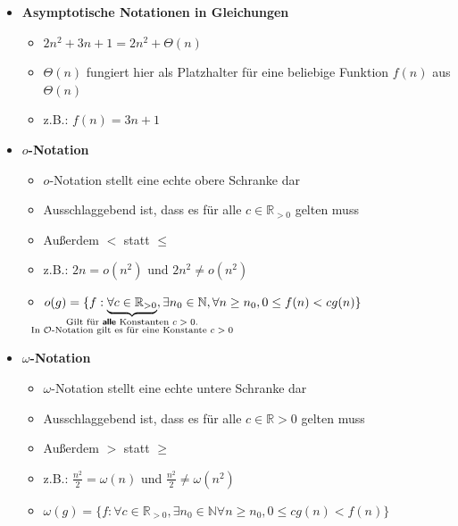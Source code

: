 \documentclass[
    12pt,
    a4paper,
    ngerman,
    color=3b,%
    marginpar=false,
    colorback=false,
    leqno,
]{tudaexercise}
\begin{document}
\begin{itemize}
    \item \textbf{Asymptotische Notationen in Gleichungen}
          \begin{itemize}
              \item $2n^2 + 3n + 1 = 2n^2 + \Theta(n)$
              \item $\Theta(n)$ fungiert hier als Platzhalter für eine beliebige Funktion $f(n)$ aus $\Theta(n)$
              \item z.B.: $f(n) = 3n + 1$
          \end{itemize}

    \item \textbf{$o$-Notation}
          \begin{itemize}
              \item $o$-Notation stellt eine echte obere Schranke dar
              \item Ausschlaggebend ist, dass es für alle $c \in \mathbb{R}_{>0}$ gelten muss
              \item Au\ss erdem $<$ statt $\leq$
              \item z.B.: $2n = o(n^2)$ und $2n^2 \neq o(n^2)$
              \item[] %
                    $o(g)=\{f:\underbrace{\forall c \in \mathbb{R}_{>0}}_{
                        \mathclap{
                            \substack{
                                \text{Gilt für \fatsf{alle} Konstanten $c>0$.}\\
                                \text{In $\mathcal{O}$-Notation gilt es für eine Konstante $c>0$}}}
                        }, \exists n_0 \in \mathbb{N}, \forall n \geq n_0, 0\leq f(n)<cg(n)\}$
          \end{itemize}

    \item \textbf{$\omega$-Notation}
          \begin{itemize}
              \item $\omega$-Notation stellt eine echte untere Schranke dar
              \item Ausschlaggebend ist, dass es für alle $c \in \mathbb{R}{>0}$ gelten muss
              \item Au\ss erdem $>$ statt $\geq$
              \item z.B.: $\frac{n^2}{2} = \omega(n)$ und $\frac{n^2}{2} \neq \omega(n^2)$
              \item[] %
                    $\omega(g)=\{f:\forall c \in \mathbb{R}_{>0},\exists n_0 \in \mathbb{N} \forall n \geq n_0,0\leq cg(n)<f(n)\}$
          \end{itemize}
\end{itemize}
\clearpage
\end{document}

